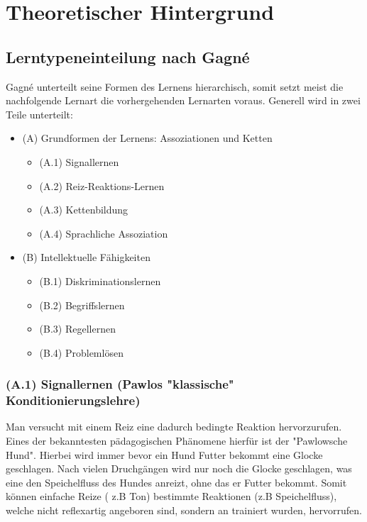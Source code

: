 \chapter{Theoretischer Hintergrund}

\section{Lerntypeneinteilung nach Gagné}

Gagné unterteilt seine Formen des Lernens hierarchisch, somit setzt meist die nachfolgende Lernart die vorhergehenden Lernarten voraus. Generell wird in zwei Teile unterteilt: 
\begin{itemize}
\item (A) Grundformen der Lernens: Assoziationen und Ketten 
    \begin{itemize}
        \item (A.1) Signallernen
        \item (A.2) Reiz-Reaktions-Lernen
        \item (A.3) Kettenbildung
        \item (A.4) Sprachliche Assoziation
    \end{itemize}
\item (B) Intellektuelle Fähigkeiten
    \begin{itemize}
        \item (B.1) Diskriminationslernen
        \item (B.2) Begriffslernen
        \item (B.3) Regellernen 
        \item (B.4) Problemlösen
    \end{itemize}
\end{itemize}

\subsection[]{(A.1) Signallernen (Pawlos "klassische" Konditionierungslehre)}

Man versucht mit einem Reiz eine dadurch bedingte Reaktion hervorzurufen. Eines der bekanntesten pädagogischen Phänomene hierfür ist der "Pawlowsche Hund". Hierbei wird immer bevor ein Hund Futter bekommt eine Glocke geschlagen. Nach vielen Druchgängen wird nur noch die Glocke geschlagen, was eine den Speichelfluss des Hundes anreizt, ohne das er Futter bekommt. Somit können einfache Reize ( z.B Ton) bestimmte Reaktionen (z.B Speichelfluss), welche nicht reflexartig angeboren sind, sondern an trainiert wurden, hervorrufen. %

